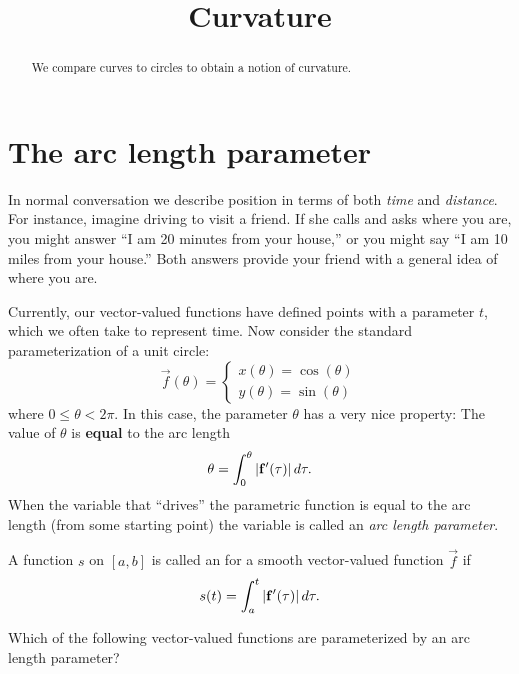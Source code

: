 \documentclass{ximera}
\title[Dig-In:]{Curvature}
\begin{document}
\begin{abstract}
We compare curves to circles to obtain a notion of curvature. 
\end{abstract}
\maketitle

\section{The arc length parameter}

In normal conversation we describe position in terms of both
\emph{time} and \emph{distance}. For instance, imagine driving to
visit a friend. If she calls and asks where you are, you might answer
``I am 20 minutes from your house,'' or you might say ``I am 10 miles
from your house.'' Both answers provide your friend with a general
idea of where you are.

Currently, our vector-valued functions have defined points with a
parameter $t$, which we often take to represent time. Now consider the
standard parameterization of a unit circle:
\[
\vec{f}(\theta)=
\begin{cases}
  x(\theta) = \cos(\theta)\\
  y(\theta) = \sin(\theta)
\end{cases}
\]
where $0\le \theta< 2\pi$. In this case, the parameter $\theta$ has a very nice
property: The value of $\theta$ is \textbf{equal} to the arc length
\[
\theta = \int_0^\theta|\mathbf{f}'(\tau)| \mathop{}\!d \tau.
\]
When the variable that ``drives'' the parametric function is equal to
the arc length (from some starting point) the variable is called an
\textit{arc length parameter}.

\begin{definition}
  A function $s$ on $[a,b]$ is called an 
  for a smooth vector-valued function $\vec{f}$ if
  \[
  s(t) = \int_{a}^t |\mathbf{f}'(\tau)| \mathop{}\!d \tau.
  \]
\end{definition}

\begin{question}
  Which of the following vector-valued functions are parameterized by
  an arc length parameter?
  \begin{selectAll}
  \end{selectAll}
\end{question}
\end{document}
